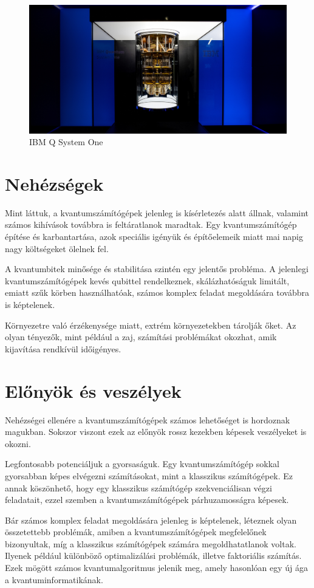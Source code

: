 \documentclass[
]{thesis-ekf}
\theoremstyle{definition}
\theoremstyle{remark}
\begin{document}
\begin{figure}
	\centering
	\includegraphics[width=0.7\linewidth]{SystemOne}
	\caption{IBM Q System One}
	\label{fig:systemone}
\end{figure}


\section{Nehézségek}
Mint láttuk, a kvantumszámítógépek jelenleg is kísérletezés alatt állnak, valamint számos kihívások továbbra is feltáratlanok maradtak. Egy kvantumszámítógép építése és karbantartása, azok speciális igényük és építőelemeik miatt mai napig nagy költségeket ölelnek fel.

A kvantumbitek minősége és stabilitása szintén egy jelentős probléma. A jelenlegi kvantumszámítógépek kevés qubittel rendelkeznek, skálázhatóságuk limitált, emiatt szűk körben használhatóak, számos komplex feladat megoldására továbbra is képtelenek.

Környezetre való érzékenysége miatt, extrém környezetekben tárolják őket. Az olyan tényezők, mint például a zaj, számítási problémákat okozhat, amik kijavítása rendkívül időigényes.

\section{Előnyök és veszélyek}
Nehézségei ellenére a kvantumszámítógépek számos lehetőséget is hordoznak magukban. Sokszor viszont ezek az előnyök rossz kezekben képesek veszélyeket is okozni.

Legfontosabb potenciáljuk a gyorsaságuk. Egy kvantumszámítógép sokkal gyorsabban képes elvégezni számításokat, mint a klasszikus számítógépek. Ez annak köszönhető, hogy egy klasszikus számítógép szekvenciálisan végzi feladatait, ezzel szemben a kvantumszámítógépek párhuzamosságra képesek.

Bár számos komplex feladat megoldására jelenleg is képtelenek, léteznek olyan összetettebb problémák, amiben a kvantumszámítógépek megfelelőnek bizonyultak, míg a klasszikus számítógépek számára megoldhatatlanok voltak. Ilyenek például különböző optimalizálási problémák, illetve faktoriális számítás. Ezek mögött számos kvantumalgoritmus jelenik meg, amely hasonlóan egy új ága a kvantuminformatikának.
\end{document}
